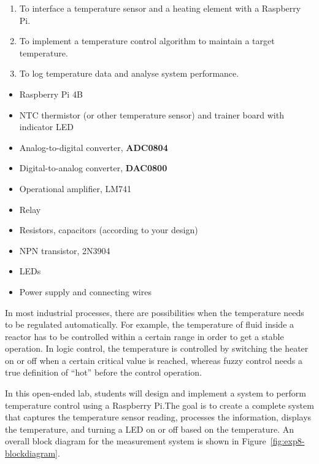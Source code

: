 
\begin{objectives}
  \begin{enumerate}
    \item To interface a temperature sensor and a heating element with a Raspberry Pi.
    \item To implement a temperature control algorithm to maintain a target temperature.
    \item To log temperature data and analyse system performance.
  \end{enumerate}
\end{objectives}

\begin{equipment}
  \begin{itemize}
    \item Raspberry Pi 4B
    \item NTC thermistor (or other temperature sensor) and trainer board with indicator LED
    \item Analog-to-digital converter, \textbf{ADC0804}
    \item Digital-to-analog converter, \textbf{DAC0800}
    \item Operational amplifier, LM741
    \item Relay
    \item Resistors, capacitors (according to your design)
    \item NPN transistor, 2N3904
    \item LEDs
    \item Power supply and connecting wires
  \end{itemize}
\end{equipment}

\begin{introduction}
  In most industrial processes, there are possibilities when the temperature needs to be regulated automatically. For example, the temperature of fluid inside a reactor has to be controlled within a certain range in order to get a stable operation. In logic control, the temperature is controlled by switching the heater on or off when a certain critical value is reached, whereas fuzzy control needs a true definition of ``hot'' before the control operation.
  \vspace*{1.5em}

  In this open-ended lab, students will design and implement a system to perform temperature control using a Raspberry Pi.The goal is to create a complete system that captures the temperature sensor reading, processes the information, displays the temperature, and turning a LED on or off based on the temperature.\newpage
  An overall block diagram for the measurement system is shown in Figure~\ref{fig:exp8-blockdiagram}.
  \vspace*{1.5em}
\end{introduction}


